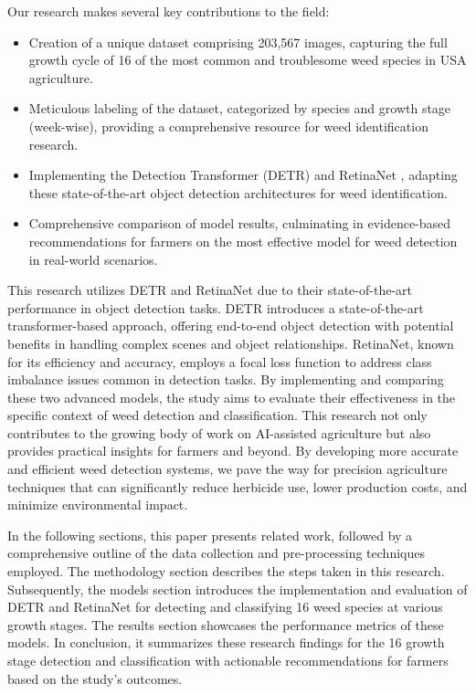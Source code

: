 Our research makes several key contributions to the field:
\begin{itemize}
    \item Creation of a unique dataset comprising 203,567 images, capturing the full growth cycle of 16 of the most common and troublesome weed species in USA agriculture.
    \item Meticulous labeling of the dataset, categorized by species and growth stage (week-wise), providing a comprehensive resource for weed identification research.
    \item Implementing the Detection Transformer (DETR) \cite{Carion2020-qn} and RetinaNet \cite{Li2020-lt}, adapting these state-of-the-art object detection architectures for weed identification.
    \item Comprehensive comparison of model results, culminating in evidence-based recommendations for farmers on the most effective model for weed detection in real-world scenarios.
\end{itemize}

This research utilizes DETR and RetinaNet due to their state-of-the-art performance in object detection tasks. DETR introduces a state-of-the-art transformer-based approach, offering end-to-end object detection with potential benefits in handling complex scenes and object relationships. RetinaNet, known for its efficiency and accuracy, employs a focal loss function to address class imbalance issues common in detection tasks. By implementing and comparing these two advanced models, the study aims to evaluate their effectiveness in the specific context of weed detection and classification. This research not only contributes to the growing body of work on AI-assisted agriculture but also provides practical insights for farmers and beyond. By developing more accurate and efficient weed detection systems, we pave the way for precision agriculture techniques that can significantly reduce herbicide use, lower production costs, and minimize environmental impact.

In the following sections, this paper presents related work, followed by a comprehensive outline of the data collection and pre-processing techniques employed. The methodology section describes the steps taken in this research. Subsequently, the models section introduces the implementation and evaluation of DETR and RetinaNet for detecting and classifying 16 weed species at various growth stages. The results section showcases the performance metrics of these models. In conclusion, it summarizes these research findings for the 16 growth stage detection and classification with actionable recommendations for farmers based on the study’s
outcomes.
